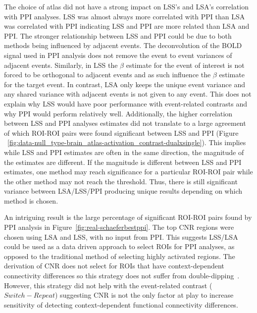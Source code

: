 \documentclass[phd,figures,tables,ackpage,abstractpage,publicabstractpage]{uithesis}
\begin{document}
The choice of atlas did not have a strong impact on LSS's and LSA's correlation with
PPI analyses.
LSS was almost always more correlated with PPI than LSA was correlated with PPI indicating
LSS and PPI are more related than LSA and PPI.
The stronger relationship between LSS and PPI could be
due to both methods being influenced by adjacent
events.
The deconvolution of the BOLD signal used in PPI analysis
does not remove the event to event variances of adjacent events.
Similarly, in LSS the $\beta$ estimate for the event of interest
is not forced to be orthogonal to adjacent events and as such
influence the $\beta$ estimate for the target event.
In contrast, LSA only keeps the unique event variance and any
shared variance with adjacent events is not given to any event.
This does not explain why LSS would have poor performance with event-related contrasts
and why PPI would perform relatively well. 
Additionally, the higher correlation between LSS and PPI analyses estimates
did not translate to a large agreement of which ROI-ROI pairs were found
significant between LSS and PPI (Figure ~\ref{fig:data-null_type-brain_atlas-activation_contrast-dualxsingle}).
This implies while LSS and PPI estimates are often in the same direction, the magnitude
of the estimates are different.
If the magnitude is different between LSS and PPI estimates,
one method may reach significance for a particular ROI-ROI pair while the other method
may not reach the threshold.
Thus, there is still significant variance between LSA/LSS/PPI producing unique results
depending on which method is chosen.

An intriguing result is the large percentage of significant ROI-ROI pairs found by
PPI analysis in Figure~\ref{fig:real-schaeferbestppi}.
The top CNR regions were chosen using LSA and LSS, with no input from PPI.
This suggests LSS/LSA could be used as a data driven approach to select ROIs
for PPI analyses, as opposed to the traditional method of selecting
highly activated regions.
The derivation of CNR does not select for ROIs that have context-dependent
connectivity differences so this strategy does not suffer from
double-dipping~\cite{Kriegeskorte2009}.
However, this strategy did not help with the event-related contrast ($Switch - Repeat$)
suggesting CNR is not the only factor at play to increase sensitivity of
detecting context-dependent functional connectivity differences.
\end{document}
